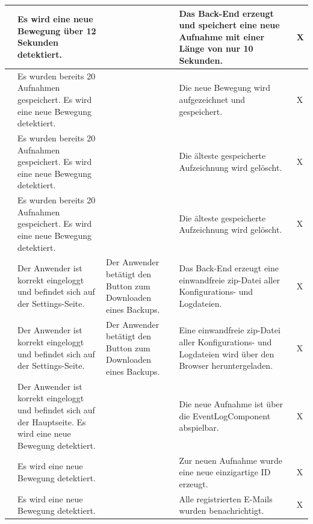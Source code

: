 \begin{longtable}{| p{} | p{} | p{} | p{} | p{} |}
	\stepcounter{SysTestNumber}\arabic{SysTestNumber} & Es wird eine neue Bewegung über 12 Sekunden detektiert. & & Das Back-End erzeugt und speichert eine neue Aufnahme mit einer Länge von nur 10 Sekunden. & X \\ \hline
	
	\stepcounter{SysTestNumber}\arabic{SysTestNumber} & Es wurden bereits 20 Aufnahmen gespeichert. Es wird eine neue Bewegung detektiert. & & Die neue Bewegung wird aufgezeichnet und gespeichert. & X \\ \hline
	
	\stepcounter{SysTestNumber}\arabic{SysTestNumber} & Es wurden bereits 20 Aufnahmen gespeichert. Es wird eine neue Bewegung detektiert. & & Die älteste gespeicherte Aufzeichnung wird gelöscht. & X \\ \hline
	
	\stepcounter{SysTestNumber}\arabic{SysTestNumber} & Es wurden bereits 20 Aufnahmen gespeichert. Es wird eine neue Bewegung detektiert. & & Die älteste gespeicherte Aufzeichnung wird gelöscht. & X \\ \hline
	
	\stepcounter{SysTestNumber}\arabic{SysTestNumber} & Der Anwender ist korrekt eingeloggt und befindet sich auf der Settings-Seite. & Der Anwender betätigt den Button zum Downloaden eines Backups. & Das Back-End erzeugt eine einwandfreie zip-Datei aller Konfigurations- und Logdateien. & X \\ \hline
	
	\stepcounter{SysTestNumber}\arabic{SysTestNumber} & Der Anwender ist korrekt eingeloggt und befindet sich auf der Settings-Seite. & Der Anwender betätigt den Button zum Downloaden eines Backups. & Eine einwandfreie zip-Datei aller Konfigurations- und Logdateien wird über den Browser heruntergeladen. & X \\ \hline
	
	\stepcounter{SysTestNumber}\arabic{SysTestNumber} & Der Anwender ist korrekt eingeloggt und befindet sich auf der Hauptseite. Es wird eine neue Bewegung detektiert. & & Die neue Aufnahme ist über die EventLogComponent abspielbar. & X \\ \hline
	
	\stepcounter{SysTestNumber}\arabic{SysTestNumber} & Es wird eine neue Bewegung detektiert. & & Zur neuen Aufnahme wurde eine neue einzigartige ID erzeugt. & X \\ \hline
	
	\stepcounter{SysTestNumber}\arabic{SysTestNumber} & Es wird eine neue Bewegung detektiert. & & Alle registrierten E-Mails wurden benachrichtigt. & X \\ \hline
	

\end{longtable}
